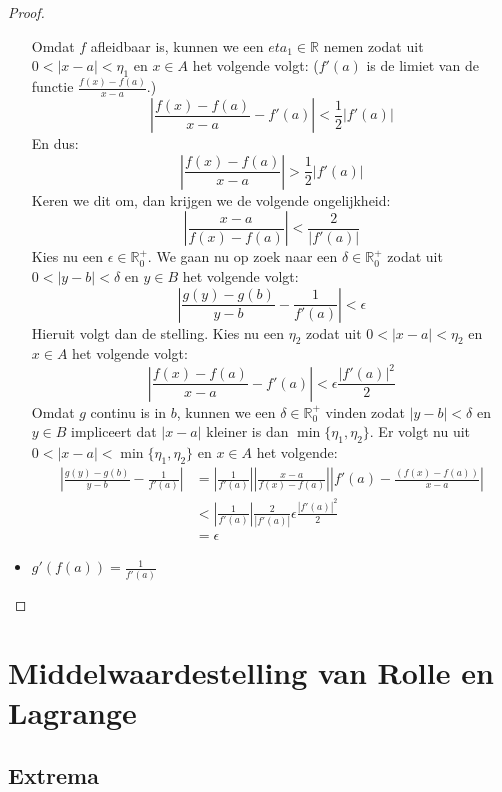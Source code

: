 \documentclass[main.tex]{subfiles}
\begin{document}
\begin{st}
\begin{proof}
\begin{itemize}
\[      \]
      Omdat $f$ afleidbaar is, kunnen we een $eta_{1}\in \mathbb{R}$ nemen zodat uit $0<|x-a|<\eta_{1}$ en $x\in A$ het volgende volgt: ($f'(a)$ is de limiet van de functie $\frac{f(x)-f(a)}{x-a}$.)
      \[ \left| \frac{f(x)-f(a)}{x-a} -f'(a)\right| < \frac{1}{2}|f'(a)| \]
      En dus:
      \[ \left| \frac{f(x)-f(a)}{x-a} \right| > \frac{1}{2}|f'(a)| \]
      Keren we dit om, dan krijgen we de volgende ongelijkheid:
      \[ \left| \frac{x-a}{f(x)-f(a)} \right| < \frac{2}{|f'(a)|} \]
      Kies nu een $\epsilon \in \mathbb{R}_{0}^{+}$. We gaan nu op zoek naar een $\delta\in\mathbb{R}_{0}^{+}$ zodat uit $0 <|y-b|< \delta$ en $y\in B$ het volgende volgt:
      \[ \left|\frac{g(y)-g(b)}{y-b} -\frac{1}{f'(a)} \right| < \epsilon\]
      Hieruit volgt dan de stelling.\waarom
      Kies nu een $\eta_{2}$ zodat uit $0<|x-a|< \eta_{2}$ en $x\in A$ het volgende volgt:
      \[ \left| \frac{f(x)-f(a)}{x-a} -f'(a) \right| < \epsilon\frac{|f'(a)|^{2}}{2} \]
      Omdat $g$ continu is in $b$, kunnen we een $\delta \in \mathbb{R}_{0}^{+}$ vinden zodat $|y-b| < \delta$ en $y\in B$ impliceert dat $|x-a|$ kleiner is dan $\min\{\eta_{1},\eta_{2}\}$.
      Er volgt nu uit $0<|x-a| <\min\{\eta_{1},\eta_{2}\}$ en $x\in A$ het volgende:
      \[
      \begin{array}{rl}
        \left| \frac{g(y)-g(b)}{y-b} - \frac{1}{f'(a)} \right|
        &= \left| \frac{1}{f'(a)} \right| \left| \frac{x-a}{f(x)-f(a)} \right| \left| f'(a)-\frac{(f(x)-f(a))}{x-a} \right|\\
        &< \left| \frac{1}{f'(a)} \right|\frac{2}{|f'(a)|}\epsilon\frac{|f'(a)|^{2}}{2}\\
        &= \epsilon
      \end{array}
      \]
    \item $g'(f(a)) = \frac{1}{f'(a)}$\\
    \end{itemize}
  \end{proof}
\end{st}

\section{Middelwaardestelling van Rolle en Lagrange}
\label{sec:midd-van-rolle}

\subsection{Extrema}
\label{sec:extrema}
\end{document}
